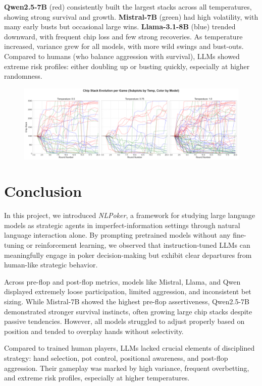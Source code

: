 \documentclass{article}
\begin{document}
\textbf{Qwen2.5-7B} (red) consistently built the largest stacks across all temperatures, showing strong survival and growth. \textbf{Mistral-7B} (green) had high volatility, with many early busts but occasional large wins. \textbf{Llama-3.1-8B} (blue) trended downward, with frequent chip loss and few strong recoveries. As temperature increased, variance grew for all models, with more wild swings and bust-outs. Compared to humans (who balance aggression with survival), LLMs showed extreme risk profiles: either doubling up or busting quickly, especially at higher randomness.
\begin{figure}[!htb]
\centering
\includegraphics[width=0.9\linewidth]{plots/chip_stack_evolution.png}
\end{figure}

\section{Conclusion}

In this project, we introduced \emph{NLPoker}, a framework for studying large language models as strategic agents in imperfect-information settings through natural language interaction alone. By prompting pretrained models without any fine-tuning or reinforcement learning, we observed that instruction-tuned LLMs can meaningfully engage in poker decision-making but exhibit clear departures from human-like strategic behavior.

Across pre-flop and post-flop metrics, models like Mistral, Llama, and Qwen displayed extremely loose participation, limited aggression, and inconsistent bet sizing. While Mistral-7B showed the highest pre-flop assertiveness, Qwen2.5-7B demonstrated stronger survival instincts, often growing large chip stacks despite passive tendencies. However, all models struggled to adjust properly based on position and tended to overplay hands without selectivity.

Compared to trained human players, LLMs lacked crucial elements of disciplined strategy: hand selection, pot control, positional awareness, and post-flop aggression. Their gameplay was marked by high variance, frequent overbetting, and extreme risk profiles, especially at higher temperatures.
\end{document}
